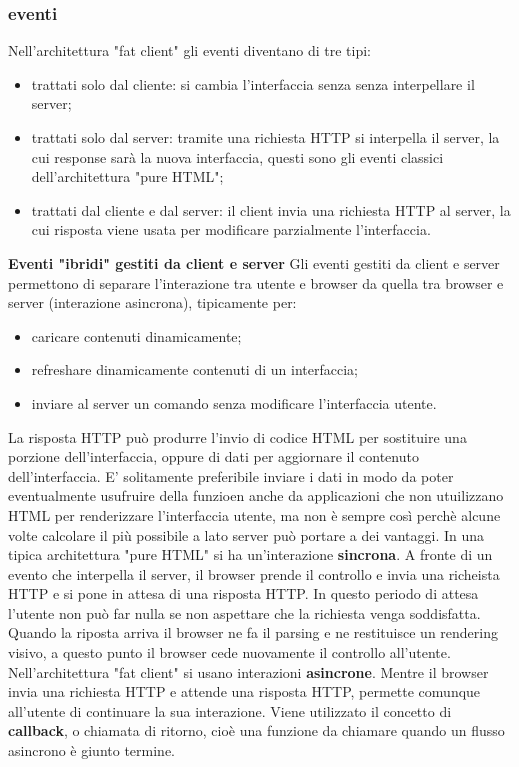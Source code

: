\subsubsection{eventi}
Nell'architettura "fat client" gli eventi diventano di tre tipi:
\begin{itemize}
    \item trattati solo dal cliente: si cambia l'interfaccia senza senza interpellare il server;
    \item trattati solo dal server: tramite una richiesta HTTP si interpella il server, la cui response sarà la nuova interfaccia, questi sono gli eventi classici dell'architettura "pure HTML";
    \item trattati dal cliente e dal server: il client invia una richiesta HTTP al server, la cui risposta viene usata per modificare parzialmente l'interfaccia.
\end{itemize}
\textbf{Eventi "ibridi" gestiti da client e server}\newline
Gli eventi gestiti da client e server permettono di separare l'interazione tra utente e browser da quella tra browser e server (interazione asincrona), tipicamente per:
\begin{itemize}
    \item caricare contenuti dinamicamente;
    \item refreshare dinamicamente contenuti di un interfaccia;
    \item inviare al server un comando senza modificare l'interfaccia utente.
\end{itemize}
La risposta HTTP può produrre l'invio di codice HTML per sostituire una porzione dell'interfaccia, oppure di dati per aggiornare il contenuto dell'interfaccia. E' solitamente preferibile inviare i dati in modo da poter eventualmente usufruire della funzioen anche da applicazioni che non utuilizzano HTML per renderizzare l'interfaccia utente, ma non è sempre così perchè alcune volte calcolare il più possibile a lato server può portare a dei vantaggi.\newline
\newline
In una tipica architettura "pure HTML" si ha un'interazione \textbf{sincrona}. A fronte di un evento che interpella il server, il browser prende il controllo e invia una richeista HTTP e si pone in attesa di una risposta HTTP. In questo periodo di attesa l'utente non può far nulla se non aspettare che la richiesta venga soddisfatta. Quando la riposta arriva il browser ne fa il parsing e ne restituisce un rendering visivo, a questo punto il browser cede nuovamente il controllo all'utente.\newline
\newline
Nell'architettura "fat client" si usano interazioni \textbf{asincrone}. Mentre il browser invia una richiesta HTTP e attende una risposta HTTP, permette comunque all'utente di continuare la sua interazione.\newline
Viene utilizzato il concetto di \textbf{callback}, o chiamata di ritorno, cioè una funzione da chiamare quando un flusso asincrono è giunto termine.\newline
